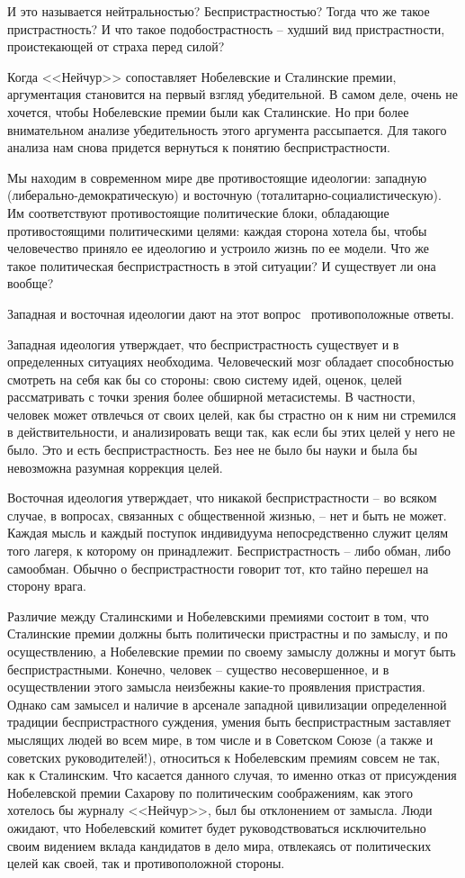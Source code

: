 \documentclass{book}
\begin{document}
И это называется нейтральностью? Беспристрастностью? Тогда что же такое пристрастность? И что такое подобостра­стность --  худший вид пристрастности, проистекающей от стра­ха перед силой?

Когда <<Нейчур>> сопоставляет Нобелевские и Сталинские премии, аргументация становится на первый взгляд убедитель­ной. В самом деле, очень не хочется, чтобы Нобелевские пре­мии были как Сталинские. Но при более внимательном анали­зе убедительность этого аргумента рассыпается. Для такого анализа нам снова придется вернуться к понятию бесприст­растности.

Мы находим в современном мире две противостоящие иде­ологии: западную (либерально-демократическую) и восточ­ную (тоталитарно-социалистическую). Им соответствуют проти­востоящие политические блоки, обладающие противостоящи­ми политическими целями: каждая сторона хотела бы, чтобы человечество приняло ее идеологию и устроило жизнь по ее модели. Что же такое политическая беспристрастность в этой ситуации? И существует ли она вообще?

Западная и восточная идеологии дают на этот вопрос  проти­воположные ответы.

Западная идеология утверждает, что беспристрастность су­ществует и в определенных ситуациях необходима. Человече­ский мозг обладает способностью смотреть на себя как бы со стороны: свою систему идей, оценок, целей рассматривать с точки зрения более обширной метасистемы. В частности, человек может отвлечься от своих целей, как бы страстно он к ним ни стремился в действительности, и анализировать вещи так, как если бы этих целей у него не было. Это и есть беспристрастность. Без нее не было бы науки и была бы невозможна разумная коррекция целей.

Восточная идеология утверждает, что никакой беспристрастности -- во всяком случае, в вопросах, связанных с общественной жизнью, -- нет и быть не может. Каждая мысль и каждый поступок индивидуума непосредственно служит целям того лагеря, к которому он принадлежит. Беспристрастность -- либо обман, либо самообман. Обычно о беспристрастности говорит тот, кто тайно перешел на сторону врага.

Различие между Сталинскими и Нобелевскими премиями состоит в том, что Сталинские премии должны быть политически пристрастны и по замыслу, и по осуществлению, а Нобелевские премии по своему замыслу должны и могут быть беспристрастными. Конечно, человек -- существо несовершенное, и в осуществлении этого замысла неизбежны какие-то проявления пристрастия. Однако сам замысел и наличие в арсенале западной цивилизации определенной традиции беспристрастного суждения, умения быть беспристрастным заставляет мыслящих людей во всем мире, в том числе и в Советском Союзе (а также и советских руководителей!), относиться к Нобелевским премиям совсем не так, как к Сталинским. Что ка­сается данного случая, то именно отказ от присуждения Нобе­левской премии Сахарову по политическим соображениям, как этого хотелось бы журналу <<Нейчур>>, был бы отклонением от замысла. Люди ожидают, что Нобелевский комитет будет руководствоваться исключительно своим видением вклада кандидатов в дело мира, отвлекаясь от политических целей как 
своей,
 так и противоположной стороны.
\end{document}
